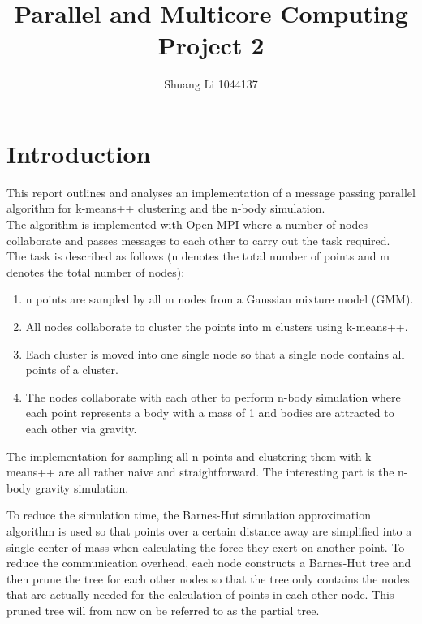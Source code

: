 \documentclass{article}
\title{Parallel and Multicore Computing Project 2}
\author{Shuang Li 1044137}
\date{}
\begin{document}
\maketitle

\section*{Introduction}
This report outlines and analyses an implementation of a message passing parallel algorithm for
k-means++ \cite{arthur2007k} clustering and the n-body simulation.\\
The algorithm is implemented with Open MPI where a number of nodes collaborate and passes messages
to each other to carry out the task required.\\
The task is described as follows (n denotes the total number of points and m denotes the total
number of nodes):
\begin{enumerate}
	\item n points are sampled by all m nodes from a Gaussian mixture model (GMM).
	\item All nodes collaborate to cluster the points into m clusters using k-means++.
	\item Each cluster is moved into one single node so that a single node contains all points of a
		cluster.
	\item The nodes collaborate with each other to perform n-body simulation where each point
		represents a body with a mass of 1 and bodies are attracted to each other via gravity.
\end{enumerate}

The implementation for sampling all n points and clustering them with k-means++ are all rather
naive and straightforward. The interesting part is the n-body gravity simulation.

To reduce the simulation time, the Barnes-Hut simulation \cite{pfalzner1997many} approximation
algorithm is used so that points over a certain distance away are simplified into a single center of
mass when calculating the force they exert on another point. To reduce the communication overhead,
each node constructs a Barnes-Hut tree and then prune the tree for each other nodes so that the tree
only contains the nodes that are actually needed for the calculation of points in each other node.
This pruned tree will from now on be referred to as the partial tree.
\end{document}
